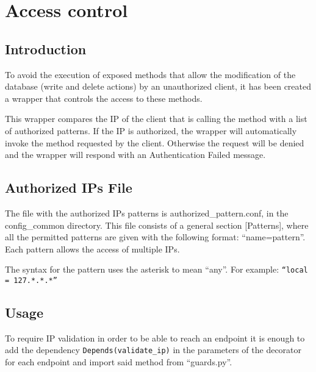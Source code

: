 \section{Access control}
\label{sec:Access_control}
\subsection{Introduction}
To avoid the execution of exposed methods that allow the modification of the database (write and delete actions) by an unauthorized 
client, it has been created a wrapper that controls the access to these methods.

This wrapper compares the IP of the client that is calling the method with a list of authorized patterns. If the IP is authorized, 
the wrapper will automatically invoke the method requested by the client. Otherwise the request will be denied and the wrapper will 
respond with an Authentication Failed message.


\subsection{Authorized IPs File}
The file with the authorized IPs patterns is authorized\_pattern.conf, in the config\_common directory. This file consists
of a general section [Patterns], where all the permitted patterns are given with the following format: ``name=pattern''. Each pattern
allows the access of multiple IPs. 

The syntax for the pattern uses the asterisk to mean ``any''. For example: {\tt``local = 127.*.*.*''}

\subsection{Usage}
To require IP validation in order to be able to reach an endpoint it is enough to add the dependency {\tt Depends(validate\_ip)} in the parameters of the decorator for each endpoint and import said method from ``guards.py''.
